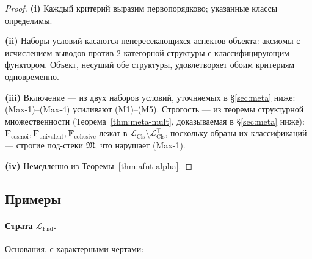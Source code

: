 \documentclass[11pt]{article}
\theoremstyle{plain}
\theoremstyle{definition}
\newcommand{\fM}{\mathfrak{M}}
\newcommand{\LFnd}{\mathcal{L}_{\mathrm{Fnd}}}
\newcommand{\LCls}{\mathcal{L}_{\mathrm{Cls}}}
\newcommand{\LClsMax}{\mathcal{L}_{\mathrm{Cls}}^{\top}}
\begin{document}
\begin{proof}
\textbf{(i)} Каждый критерий выразим первопорядково; указанные классы определимы.

\textbf{(ii)} Наборы условий касаются непересекающихся аспектов объекта: аксиомы с исчислением выводов против $2$-категорной структуры с классифицирующим функтором. Объект, несущий обе структуры, удовлетворяет обоим критериям одновременно.

\textbf{(iii)} Включение — из двух наборов условий, уточняемых в \S\ref{sec:meta} ниже: (Max-1)--(Max-4) усиливают (M1)--(M5). Строгость — из теоремы структурной множественности (Теорема~\ref{thm:meta-mult}, доказываемая в \S\ref{sec:meta} ниже): $\mathbf{F}_{\mathrm{cosmoi}}, \mathbf{F}_{\mathrm{univalent}}, \mathbf{F}_{\mathrm{cohesive}}$ лежат в $\LCls \setminus \LClsMax$, поскольку образы их классификаций — строгие под-стеки $\fM$, что нарушает (Max-1).

\textbf{(iv)} Немедленно из Теоремы~\ref{thm:afnt-alpha}.
\end{proof}

\subsection{Примеры}

\paragraph{Страта $\LFnd$.} Основания, с характерными чертами:
\end{document}
